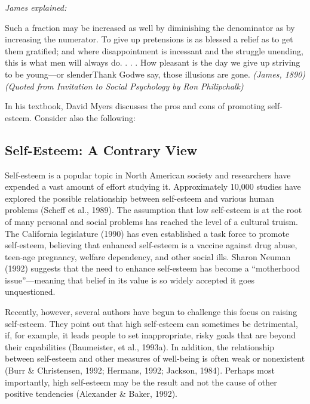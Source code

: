 \documentclass[
]{book}
\begin{document}
\emph{James explained:}

Such a fraction may be increased as well by diminishing the denominator as by increasing the numerator. To give up pretensions is as blessed a relief as to get them gratified; and where disappointment is incessant and the struggle unending, this is what men will always do. . . . How pleasant is the day we give up striving to be young---or slenderThank Godwe say, those illusions are gone. \emph{(James, 1890) (Quoted from Invitation to Social Psychology by Ron Philipchalk)}

In his textbook, David Myers discusses the pros and cons of promoting self-esteem. Consider also the following:

\hypertarget{self-esteem-a-contrary-view}{%
\subsection*{Self-Esteem: A Contrary View}\label{self-esteem-a-contrary-view}}

Self-esteem is a popular topic in North American society and researchers have expended a vast amount of effort studying it. Approximately 10,000 studies have explored the possible relationship between self-esteem and various human problems (Scheff et al., 1989). The assumption that low self-esteem is at the root of many personal and social problems has reached the level of a cultural truism. The California legislature (1990) has even established a task force to promote self-esteem, believing that enhanced self-esteem is a vaccine against drug abuse, teen-age pregnancy, welfare dependency, and other social ills. Sharon Neuman (1992) suggests that the need to enhance self-esteem has become a ``motherhood issue''---meaning that belief in its value is so widely accepted it goes unquestioned.

Recently, however, several authors have begun to challenge this focus on raising self-esteem. They point out that high self-esteem can sometimes be detrimental, if, for example, it leads people to set inappropriate, risky goals that are beyond their capabilities (Baumeister, et al., 1993a). In addition, the relationship between self-esteem and other measures of well-being is often weak or nonexistent (Burr \& Christensen, 1992; Hermans, 1992; Jackson, 1984). Perhaps most importantly, high self-esteem may be the result and not the cause of other positive tendencies (Alexander \& Baker, 1992).
\end{document}
